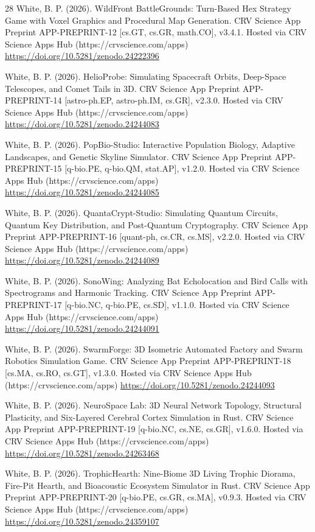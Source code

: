 \documentclass[10pt,letterpaper]{article}
\begin{document}
\begin{thebibliography}{28}
 White, B. P. (2026). WildFront BattleGrounds: Turn-Based Hex Strategy Game with Voxel Graphics and Procedural Map Generation. CRV Science App Preprint APP-PREPRINT-12 [cs.GT, cs.GR, math.CO], v3.4.1. Hosted via CRV Science Apps Hub (https://crvscience.com/apps) \url{https://doi.org/10.5281/zenodo.24222396}

 White, B. P. (2026). HelioProbe: Simulating Spacecraft Orbits, Deep-Space Telescopes, and Comet Tails in 3D. CRV Science App Preprint APP-PREPRINT-14 [astro-ph.EP, astro-ph.IM, cs.GR], v2.3.0. Hosted via CRV Science Apps Hub (https://crvscience.com/apps) \url{https://doi.org/10.5281/zenodo.24244083}

 White, B. P. (2026). PopBio-Studio: Interactive Population Biology, Adaptive Landscapes, and Genetic Skyline Simulator. CRV Science App Preprint APP-PREPRINT-15 [q-bio.PE, q-bio.QM, stat.AP], v1.2.0. Hosted via CRV Science Apps Hub (https://crvscience.com/apps) \url{https://doi.org/10.5281/zenodo.24244085}

 White, B. P. (2026). QuantaCrypt-Studio: Simulating Quantum Circuits, Quantum Key Distribution, and Post-Quantum Cryptography. CRV Science App Preprint APP-PREPRINT-16 [quant-ph, cs.CR, cs.MS], v2.2.0. Hosted via CRV Science Apps Hub (https://crvscience.com/apps) \url{https://doi.org/10.5281/zenodo.24244089}

 White, B. P. (2026). SonoWing: Analyzing Bat Echolocation and Bird Calls with Spectrograms and Harmonic Tracking. CRV Science App Preprint APP-PREPRINT-17 [q-bio.NC, q-bio.PE, cs.SD], v1.1.0. Hosted via CRV Science Apps Hub (https://crvscience.com/apps) \url{https://doi.org/10.5281/zenodo.24244091}

 White, B. P. (2026). SwarmForge: 3D Isometric Automated Factory and Swarm Robotics Simulation Game. CRV Science App Preprint APP-PREPRINT-18 [cs.MA, cs.RO, cs.GT], v1.3.0. Hosted via CRV Science Apps Hub (https://crvscience.com/apps) \url{https://doi.org/10.5281/zenodo.24244093}

 White, B. P. (2026). NeuroSpace Lab: 3D Neural Network Topology, Structural Plasticity, and Six-Layered Cerebral Cortex Simulation in Rust. CRV Science App Preprint APP-PREPRINT-19 [q-bio.NC, cs.NE, cs.GR], v1.6.0. Hosted via CRV Science Apps Hub (https://crvscience.com/apps) \url{https://doi.org/10.5281/zenodo.24263468}

 White, B. P. (2026). TrophicHearth: Nine-Biome 3D Living Trophic Diorama, Fire-Pit Hearth, and Bioacoustic Ecosystem Simulator in Rust. CRV Science App Preprint APP-PREPRINT-20 [q-bio.PE, cs.GR, cs.MA], v0.9.3. Hosted via CRV Science Apps Hub (https://crvscience.com/apps) \url{https://doi.org/10.5281/zenodo.24359107}


\end{thebibliography}
\end{document}
